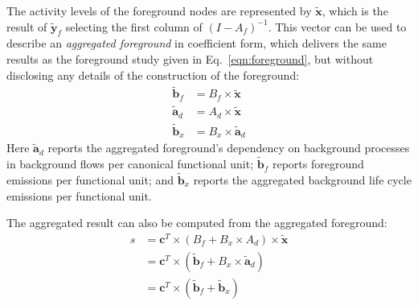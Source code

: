The activity levels of the foreground nodes are represented by $\tilde{\mathbf{x}}$, which is the result of $\tilde{\mathbf{y}}_f$ selecting the first column of $(I-A_f)^{-1}$.
This vector can be used to describe an \emph{aggregated foreground} in coefficient form, which delivers the same results as the foreground study given in Eq.~\ref{eqn:foreground}, but without disclosing any details of the construction of the foreground:
\begin{equation}
\begin{array}{rl}
    \tilde{\mathbf{b}}_f & = B_f \times \tilde{\mathbf{x}} \\
    \tilde{\mathbf{a}}_d & = A_d \times \tilde{\mathbf{x}} \\
    \tilde{\mathbf{b}}_x & = B_x \times \tilde{\mathbf{a}}_d
\end{array}
\label{eqn:agg}
\end{equation}
Here $\tilde{\mathbf{a}}_d$ reports the aggregated foreground's dependency on background processes in background flows per canonical functional unit;  $\tilde{\mathbf{b}}_f$ reports foreground emissions per functional unit; and $\tilde{\mathbf{b}}_x$ reports the aggregated background life cycle emissions per functional unit.

The aggregated result can also be computed from the aggregated foreground:
\begin{equation}
\begin{array}{rl}
s & = \mathbf{c}^T \times( B_f + B_x \times A_d) \times \tilde{\mathbf{x}} \\
  & = \mathbf{c}^T \times( \tilde{\mathbf{b}}_f + B_x \times\tilde{\mathbf{a}}_d) \\
  & = \mathbf{c}^T \times( \tilde{\mathbf{b}}_f + \tilde{\mathbf{b}}_x) \\
\end{array}
\end{equation}
